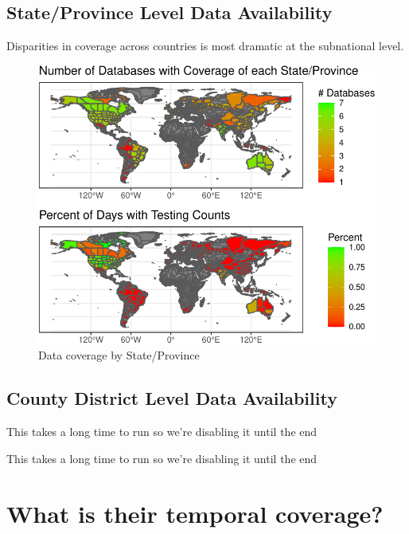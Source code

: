 \documentclass[
]{book}
\begin{document}
\hypertarget{stateprovince-level-data-availability}{%
\subsection{State/Province Level Data Availability}\label{stateprovince-level-data-availability}}

Disparities in coverage across countries is most dramatic at the subnational level.

\begin{figure}

{\centering \includegraphics{HowToBeCarefulWithCovid19Counts_files/figure-latex/nice-fig3-1} 

}

\caption{Data coverage by State/Province}\label{fig:nice-fig3}
\end{figure}

\hypertarget{county-district-level-data-availability}{%
\subsection{County District Level Data Availability}\label{county-district-level-data-availability}}

This takes a long time to run so we're disabling it until the end

This takes a long time to run so we're disabling it until the end

\hypertarget{what-is-their-temporal-coverage}{%
\section{What is their temporal coverage?}\label{what-is-their-temporal-coverage}}
\end{document}

